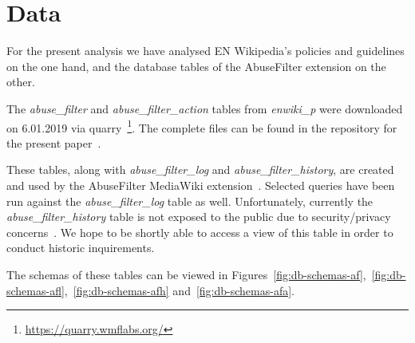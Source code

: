 \documentclass{sigchi}
\begin{document}

\section{Data}

For the present analysis we have analysed EN Wikipedia's policies and guidelines on the one hand, and the database tables of the AbuseFilter extension on the other.

The \emph{abuse\_filter} and \emph{abuse\_filter\_action} tables from \emph{enwiki\_p} were downloaded on 6.01.2019 via quarry~\footnote{\url{https://quarry.wmflabs.org/}}.
The complete files can be found in the repository for the present paper~\cite{github}. %

These tables, along with \emph{abuse\_filter\_log} and \emph{abuse\_filter\_history}, are created and used by the AbuseFilter MediaWiki extension~\cite{gerrit-abusefilter}.
Selected queries have been run against the \emph{abuse\_filter\_log} table as well.
Unfortunately, currently the \emph{abuse\_filter\_history} table is not exposed to the public due to security/privacy concerns~\cite{phabricator}.
We hope to be shortly able to access a view of this table in order to conduct historic inquirements.

The schemas of these tables can be viewed in Figures~\ref{fig:db-schemas-af},~\ref{fig:db-schemas-afl},~\ref{fig:db-schemas-afh} and~\ref{fig:db-schemas-afa}.
\end{document}

